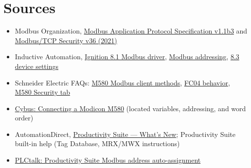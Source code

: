 \section{Sources}
\begin{itemize}[itemsep=1pt]
  \item Modbus Organization, \href{https://www.modbus.org/modbus-specifications}{Modbus Application Protocol Specification v1.1b3} and \href{https://assets.noviams.com/novi-file-uploads/modbus/pdfs-and-documents/MB-TCP-Security-v36_2021-07-30.pdf}{Modbus/TCP Security v36 (2021)}
  \item Inductive Automation, \href{https://www.docs.inductiveautomation.com/docs/8.1/ignition-modules/opc-ua/opc-ua-drivers/modbus}{Ignition 8.1 Modbus driver}, \href{https://www.docs.inductiveautomation.com/docs/8.1/ignition-modules/opc-ua/opc-ua-drivers/modbus/modbus-addressing}{Modbus addressing}, \href{https://www.docs.inductiveautomation.com/docs/8.3/ignition-modules/opc-ua/opc-ua-drivers/modbus/connecting-to-modbus-device}{8.3 device settings}
  \item Schneider Electric FAQs: \href{https://www.se.com/au/en/faqs/FAQ000223813/}{M580 Modbus client methods}, \href{https://www.se.com/uk/en/faqs/FAQ000222833/}{FC04 behavior}, \href{https://www.se.com/ca/en/faqs/FA282558/}{M580 Security tab}
  \item \href{https://docs.cybus.io/2-4-2/guides/machine-connectivity/plcs-industrial-controllers/connecting-a-schneider-modicon-m580-plc}{Cybus: Connecting a Modicon M580} (located variables, addressing, and word order)
  \item AutomationDirect, \href{https://www.automationdirect.com/productivity/software/softwarewhatsnew}{Productivity Suite --- What's New}; Productivity Suite built-in help (Tag Database, MRX/MWX instructions)
  \item \href{https://www.plctalk.net/forums/threads/questions-about-programming-with-productivity-suite-software.112341/}{PLCtalk: Productivity Suite Modbus address auto-assignment}
\end{itemize}
